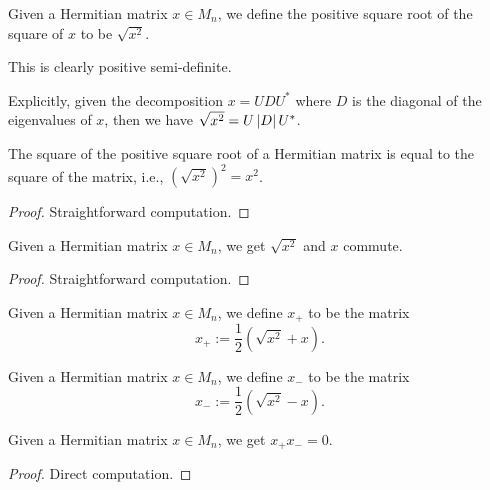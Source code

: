  \begin{definition}\label{Matrix.IsHermitian.sqSqrt}\leanok
  Given a Hermitian matrix $x\in M_n$, we define the positive square root of the square of $x$ to be $\sqrt{x^2}$.

  This is clearly positive semi-definite.

  Explicitly, given the decomposition $x=UDU^*$ where $D$ is the diagonal of the eigenvalues of $x$, then we have $\sqrt{x^2}=U\left\lvert{D}\right\rvert U^*$.
 \end{definition}
 
 \begin{lemma}\label{Matrix.IsHermitian.sqSqrt_sq}
  \leanok
  The square of the positive square root of a Hermitian matrix is equal to the square of the matrix, i.e., $\left(\sqrt{x^2}\right)^2=x^2$.
 \end{lemma}
 \begin{proof}\leanok
  Straightforward computation.
 \end{proof}

 \begin{corollary}\label{Matrix.IsHermitian.commute_sqSqrt}
  \leanok
  Given a Hermitian matrix $x\in M_n$, we get $\sqrt{x^2}$ and $x$ commute.
 \end{corollary}
 \begin{proof}\leanok
  Straightforward computation.
 \end{proof}

 \begin{definition}\label{posSemidefDecomposition_left}
  \leanok
  Given a Hermitian matrix $x\in M_n$, we define $x_+$ to be the matrix \[x_+:= \frac{1}{2}(\sqrt{x^2} + x).\]
 \end{definition}
 \begin{definition}\label{posSemidefDecomposition_right}
  \leanok
  Given a Hermitian matrix $x\in M_n$, we define $x_-$ to be the matrix \[x_-:= \frac{1}{2}(\sqrt{x^2} - x).\]
 \end{definition}

 \begin{lemma}\label{posSemidefDecomposition_left_mul_right}
  \leanok
  Given a Hermitian matrix $x\in M_n$, we get $x_+x_-=0$.
 \end{lemma}
 \begin{proof}\leanok
  Direct computation.
 \end{proof}

